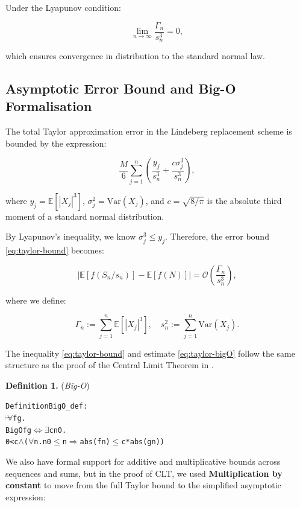Under the Lyapunov condition:

\[
\lim_{n \to \infty} \frac{\Gamma_n}{s_n^3} = 0,
\]

which ensures convergence in distribution to the standard normal law.

\subsection{Asymptotic Error Bound and Big-O Formalisation}

The total Taylor approximation error in the Lindeberg replacement scheme is bounded by the expression:

\begin{equation}
\label{eq:taylor-bound}
\frac{M}{6} \sum_{j = 1}^{n} \left( \frac{y_j}{s_n^3} + \frac{c \sigma_j^3}{s_n^3} \right),
\end{equation}

where \( y_j = \mathbb{E}[|X_j|^3] \), \( \sigma_j^2 = \text{Var}(X_j) \), and \( c = \sqrt{8/\pi} \) is the absolute third moment of a standard normal distribution.

By Lyapunov’s inequality, we know \( \sigma_j^3 \le y_j \). Therefore, the error bound \eqref{eq:taylor-bound} becomes:

\begin{equation} \label{eq:taylor-bigO}
\left| \mathbb{E}[f(S_n / s_n)] - \mathbb{E}[f(N)] \right| = \mathcal{O}\left( \frac{\Gamma_n}{s_n^3} \right),
\end{equation}

where we define:

\[
\Gamma_n := \sum_{j=1}^n \mathbb{E}[|X_j|^3],
\quad
s_n^2 := \sum_{j=1}^n \mathrm{Var}(X_j).
\]

The inequality \eqref{eq:taylor-bound} and estimate \eqref{eq:taylor-bigO} follow the same structure as the proof of the Central Limit Theorem in \cite{Chung:2001}.

\textbf{Definition 1.} (\emph{Big-O})
\begin{hol}
\begin{alltt}
Definition BigO\_def :
\(\!\!\!{\turn}\!\!\!\!\) \(\forall\)f g.
BigO f g \(\Leftrightarrow\) \(\exists\)c n0.
0 < c \(\land\) (\(\forall\)n. n0 \(\le\) n \(\Rightarrow\) abs (f n) \(\le\) c * abs (g n))
\end{alltt}
\end{hol}

We also have formal support for additive and multiplicative bounds across sequences and sums, but in the proof of CLT, we used \textbf{Multiplication by constant} to move from the full Taylor bound to the simplified asymptotic expression:

